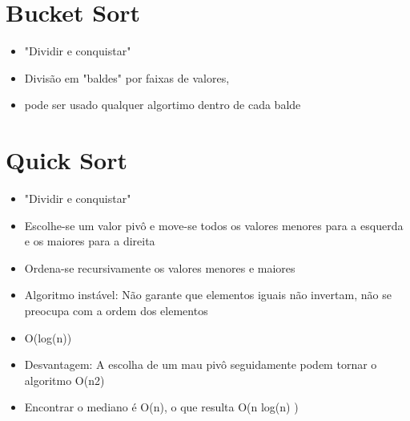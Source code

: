 \documentclass{article}
\begin{document}
\section{Bucket Sort}
	\begin{itemize}
	\item "Dividir e conquistar"
	\item Divisão em "baldes" por faixas de valores,
	\item pode ser usado qualquer algortimo dentro de cada balde
	\end{itemize}
	
\section{Quick Sort}
	\begin{itemize}
	\item "Dividir e conquistar"
	\item Escolhe-se um valor pivô e move-se todos os valores menores para a esquerda e os maiores para a direita
	\item Ordena-se recursivamente os valores menores e maiores
	\item Algoritmo instável: Não garante que elementos iguais não invertam, não se preocupa com a ordem dos elementos
	\item O(log(n))
	\item Desvantagem: A escolha de um mau pivô seguidamente podem tornar o algoritmo O(n2)
	\item Encontrar o mediano é O(n), o que resulta O(n log(n) ) 
	\end{itemize}
\end{document}
